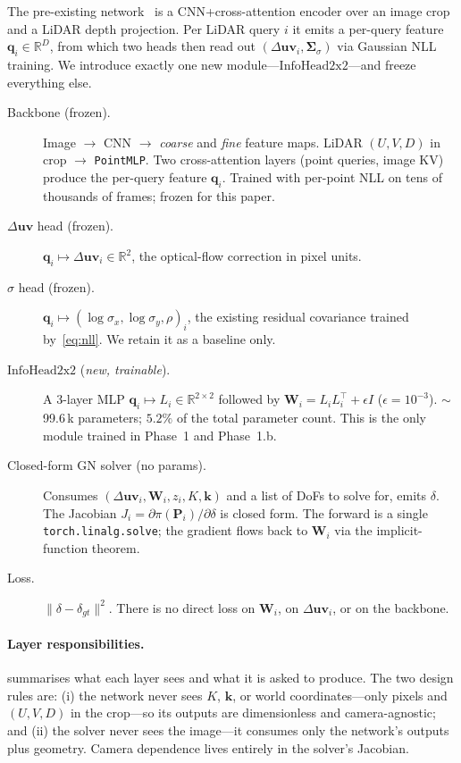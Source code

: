\documentclass[10pt,conference,a4paper]{IEEEtran}
\newcommand{\Suv}{\Delta\mathbf{uv}}
\newcommand{\W}{\mathbf{W}}
\newcommand{\Sig}{\boldsymbol{\Sigma}}
\newcommand{\R}{\mathbb{R}}
\begin{document}
The pre-existing network~\cite{cite:CalibNetDepth} is a
CNN+cross-attention encoder over an image crop and a LiDAR depth
projection. Per LiDAR query $i$ it emits a per-query feature
$\mathbf{q}_i \in \R^D$, from which two heads then read out
$(\Suv_i, \Sig_\sigma)$ via Gaussian NLL training. We introduce
exactly one new module---$\mathrm{InfoHead2x2}$---and freeze
everything else.
%
\begin{description}
\item[Backbone (frozen).] Image $\to$ CNN $\to$ \emph{coarse} and
\emph{fine} feature maps. LiDAR $(U,V,D)$ in crop $\to$
\texttt{PointMLP}. Two cross-attention layers (point queries, image
KV) produce the per-query feature $\mathbf{q}_i$. Trained with
per-point NLL on tens of thousands of frames; frozen for this paper.
\item[$\Suv$ head (frozen).] $\mathbf{q}_i \mapsto \Suv_i \in \R^2$,
the optical-flow correction in pixel units.
\item[$\sigma$ head (frozen).] $\mathbf{q}_i \mapsto
(\log\sigma_x,\log\sigma_y,\rho)_i$, the existing residual covariance
trained by~\eqref{eq:nll}. We retain it as a baseline only.
\item[$\mathrm{InfoHead2x2}$ (\emph{new, trainable}).] A 3-layer MLP
$\mathbf{q}_i \mapsto L_i \in \R^{2\times 2}$ followed by
$\W_i = L_iL_i^\top + \epsilon I$ ($\epsilon{=}10^{-3}$).
$\sim$99.6\,k parameters; $5.2\%$ of the total parameter count.
This is the only module trained in Phase~1 and Phase~1.b.
\item[Closed-form GN solver (no params).] Consumes
$(\Suv_i, \W_i, z_i, K, \mathbf{k})$ and a list of DoFs to solve for,
emits $\delta$. The Jacobian
$J_i = \partial \pi(\mathbf{P}_i)/\partial \delta$ is closed form.
The forward is a single \texttt{torch.linalg.solve}; the gradient
flows back to $\W_i$ via the implicit-function theorem.
\item[Loss.] $\|\delta - \delta_{gt}\|^2$. There is no direct
loss on $\W_i$, on $\Suv_i$, or on the backbone.
\end{description}

\paragraph{Layer responsibilities.}
 summarises what each layer sees and what it is asked to
produce. The two design rules are: (i) the network never sees $K$,
$\mathbf{k}$, or world coordinates---only pixels and $(U,V,D)$ in the
crop---so its outputs are dimensionless and camera-agnostic; and (ii)
the solver never sees the image---it consumes only the network's
outputs plus geometry. Camera dependence lives entirely in the
solver's Jacobian.
\end{document}

